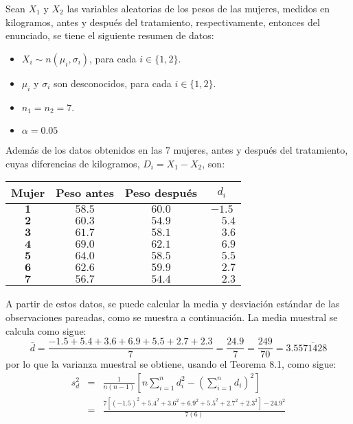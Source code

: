 \begin{solucion}
 Sean $X_1$ y $X_2$ las variables aleatorias de los pesos de las mujeres, medidos en kilogramos, antes y despu\'es del tratamiento, respectivamente, entonces del enunciado, se tiene el siguiente resumen de datos:
 \begin{itemize}
  \item $X_i \sim n\left( \mu_i, \sigma_i \right)$, para cada $i \in \{ 1, 2\}$.
  \item $\mu_i$ y $\sigma_i$ son desconocidos, para cada $i \in \{ 1, 2 \}$.
  \item $n_1 = n_2 = 7$.
  \item $\alpha = 0.05$
 \end{itemize}
 Adem\'as de los datos obtenidos en las $7$ mujeres, antes y despu\'es del tratamiento, cuyas diferencias de kilogramos, $D_i = X_1 - X_2$, son:
 \begin{center}
  \begin{tabular}{cccc}
   \textbf{Mujer} & \textbf{Peso antes} & \textbf{Peso despu\'es} & $d_i$ \\
   \hline 
   $\mathbf{1}$ & $58.5$ & $60.0$ & $-1.5$ \\
   $\mathbf{2}$ & $60.3$ & $54.9$ & $\phantom{-}5.4$ \\
   $\mathbf{3}$ & $61.7$ & $58.1$ & $\phantom{-}3.6$ \\
   $\mathbf{4}$ & $69.0$ & $62.1$ & $\phantom{-}6.9$ \\
   $\mathbf{5}$ & $64.0$ & $58.5$ & $\phantom{-}5.5$ \\
   $\mathbf{6}$ & $62.6$ & $59.9$ & $\phantom{-}2.7$ \\
   $\mathbf{7}$ & $56.7$ & $54.4$ & $\phantom{-}2.3$
  \end{tabular}
 \end{center}
 A partir de estos datos, se puede calcular la media y desviaci\'on est\'andar de las observaciones pareadas, como se muestra a continuaci\'on. La media muestral se calcula como sigue:
 \begin{equation*}
  \bar{d} = \frac{-1.5+5.4+3.6+6.9+5.5+2.7+2.3}{7} = \frac{24.9}{7} = \frac{249}{70} = 3.5\overline{571428}
 \end{equation*}
 por lo que la varianza muestral se obtiene, usando el Teorema 8.1, como sigue:
 \begin{eqnarray*}
  s_d^2 & = & \frac{1}{n(n-1)} \left[ n\sum_{i=1}^n d_i^2 - \left( \sum_{i=1}^n d_i \right)^2 \right] \\
  & = & \frac{7\left[ (-1.5)^2 + 5.4^2 + 3.6^2 + 6.9^2 + 5.5^2 + 2.7^2 + 2.3^2 \right] - 24.9^2}{7(6)} \\

\end{eqnarray*}
\end{solucion}
